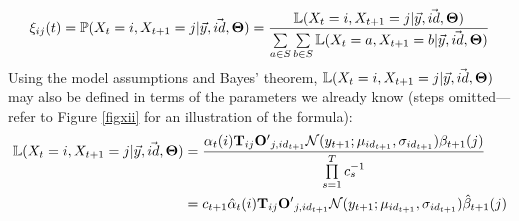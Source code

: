 \documentclass[12pt,a4paper,twoside,openright]{report}
\begin{document}
\[\xi_{ij}(t) = \mathbb{P}(X_t = i, X_{t+1} = j | \vec{y}, \vec{id}, {\bf\Theta}) = \frac{\mathbb{L}(X_t = i, X_{t+1} = j | \vec{y}, \vec{id}, {\bf\Theta})}{\sum\limits_{a\in S}\sum\limits_{b\in S}\mathbb{L}(X_t = a, X_{t+1} = b | \vec{y}, \vec{id}, {\bf\Theta})}\]
Using the model assumptions and Bayes' theorem, $\mathbb{L}(X_t = i, X_{t+1} = j | \vec{y}, \vec{id}, {\bf\Theta})$ may also be defined in terms of the parameters we already know (steps omitted---refer to Figure \ref{figxii} for an illustration of the formula):
\[\begin{aligned}\mathbb{L}(X_t = i, X_{t+1} = j | \vec{y}, \vec{id}, {\bf\Theta}) &= \frac{\alpha_t(i){\bf T}_{ij}{\bf O'}_{j,id_{t+1}}\mathcal{N}(y_{t+1}; \mu_{id_{t+1}}, \sigma_{id_{t+1}})\beta_{t+1}(j)}{\prod\limits_{s=1}^T{c_s^{-1}}}\\
&= c_{t+1}\hat{\alpha}_t(i){\bf T}_{ij}{\bf O'}_{j,id_{t+1}}\mathcal{N}(y_{t+1}; \mu_{id_{t+1}}, \sigma_{id_{t+1}})\hat{\beta}_{t+1}(j)\\
\end{aligned}\]
\end{document}
